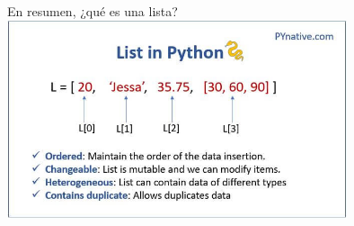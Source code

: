 \documentclass{beamer}
\begin{document}
\begin{frame}{En resumen, ¿qué es una lista?}
\pause
\includegraphics[width=10cm]{recursos/python_list.png} 
\end{frame}
\end{document}
